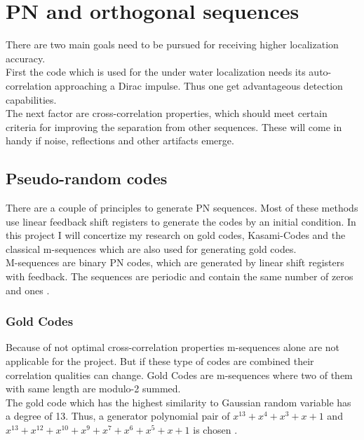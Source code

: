 \chapter{PN and orthogonal sequences}

There are two main goals need to be pursued for receiving higher localization accuracy.\\    
First the code which is used for the under water localization needs its auto-correlation approaching a Dirac impulse. Thus one get advantageous detection capabilities.\\
The next factor are cross-correlation properties, which should meet certain criteria for improving the separation from other sequences. These will come in handy if noise, reflections and other artifacts emerge.

\section{Pseudo-random codes}

There are a couple of principles to generate PN sequences. Most of these methods use linear feedback shift registers to generate the codes by an initial condition. In this project I will concertize my research on gold codes, Kasami-Codes and the classical m-sequences which are also used for generating gold codes.\\
M-sequences are binary PN codes, which are generated by linear shift registers with feedback. The sequences are periodic and contain the same number of zeros and ones \cite{proakis08}. 


\subsection{Gold Codes}

Because of not optimal cross-correlation properties m-sequences alone are not applicable for the project. But if these type of codes are combined their correlation qualities can change. Gold Codes are m-sequences where two of them with same length are modulo-2 summed. \cite{proakis08} \\
The gold code which has the highest similarity to Gaussian random variable has a degree of 13. Thus, a generator polynomial pair of $x^13+x^4+x^3+x+1$ and $x^13+x^12+x^10+x^9+x^7+x^6+x^5+x+1$ is chosen \cite{merrifield} .

